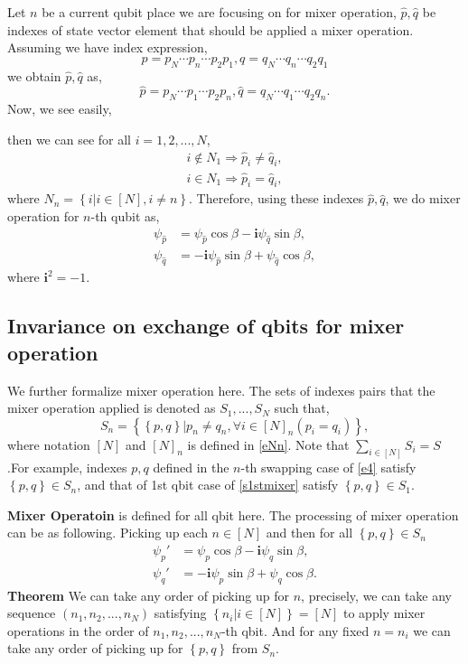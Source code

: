 \documentclass[a4paper]{article}
\newcommand{\eqlabel}[1]{\label{#1}}
\newcommand{\br}[1]{\left(#1\right)}
\newcommand{\cbr}[1]{\left\{#1\right\}}
\newcommand{\ci}{\mathbf{i}}
\newcommand{\hatp}{{\hat{p}}}
\newcommand{\hatq}{{\hat{q}}}
\begin{document}
Let \(n\) be a current qubit place we are focusing on for mixer operation, \(\hat{p}, \hat{q}\) be indexes of state vector element that should be applied a mixer operation. Assuming we have index expression,
\begin{equation}
    \eqlabel{e4}
    p = p_N\cdots p_n\cdots p_2p_1, q = q_N\cdots q_n \cdots q_2q_1
\end{equation}
we obtain \(\hat{p}, \hat{q}\) as,
\begin{equation}
    \hat{p} = p_N \cdots p_1\cdots p_2 p_n, \hat{q} = q_N \cdots q_1\cdots q_2 q_n.
\end{equation}
Now, we see easily,

then we can see for all \(i = 1,2,...,N\),
\[
\begin{matrix}
    i \not\in N_1 \Rightarrow \hatp_i \neq \hatq_i,\\
    i\in N_1 \Rightarrow \hatp_i = \hatq_i,
\end{matrix}
\]
where \(N_n = \cbr{i|i\in [N], i\neq n}\). Therefore, using these indexes \(\hat{p}, \hat{q}\), we do mixer operation for \(n\)-th qubit as, 
\begin{align}
    \nonumber
    \psi_\hatp &= \psi_\hatp\cos\beta - \ci\psi_\hatq \sin \beta,\\
    \eqlabel{emg}
    \psi_\hatq &= -\ci\psi_\hatp \sin \beta  + \psi_\hatq \cos \beta,
\end{align}
where \(\ci^2 = -1\).
\subsection{Invariance on exchange of qbits for mixer operation}
\label{mixerInvariance}
We further formalize mixer operation here. The sets of indexes pairs that the mixer operation applied is denoted as \(S_1, ...,S_N\) such that,
\begin{equation}
    \eqlabel{eSn}
    S_n = \cbr{\cbr{p, q}| p_n\neq q_n, \forall i\in [N]_n \br{p_i = q_i}},
\end{equation}
where notation \([N]\) and \([N]_n\) is defined in \eqref{eNn}. Note that \(\sum_{i\in [N]}S_i = S\).For example, indexes \(p, q\) defined in the \(n\)-th swapping case of \eqref{e4} satisfy \(\cbr{p, q}\in S_n\), and that of 1st qbit case of \eqref{s1stmixer} satisfy \(\cbr{p, q}\in S_1\).

\textbf{Mixer Operatoin} is defined for all qbit here. The processing of mixer operation can be as following. Picking up each \(n\in [N]\) and then for all \(\cbr{p, q}\in S_n\) 
\begin{align}
    \nonumber
    \psi_{p}' &= \psi_{p}\cos\beta - \ci\psi_{q} \sin \beta, \\
    \eqlabel{emg2}
    \psi_{q}' &= -\ci\psi_{p} \sin \beta + \psi_{q} \cos \beta.
\end{align}
\textbf{Theorem} We can take any order of picking up for \(n\), precisely, we can take any sequence \((n_1, n_2,..., n_N)\) satisfying \(\cbr{n_i|i\in [N]} = [N]\) to apply mixer operations in the order of \(n_1, n_2,..., n_N\)-th qbit. And for any fixed \(n = n_i\) we can take any order of picking up for \(\cbr{p, q}\) from \(S_n\).
\end{document}
